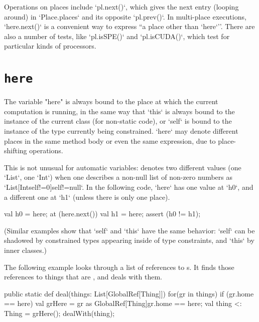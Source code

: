 Operations on places include \xcd`pl.next()`, which gives the next entry
(looping around) in \xcd`Place.places` and its opposite \xcd`pl.prev()`. 
In multi-place executions, 
\xcd`here.next()` is a convenient way to express ``a place other than \xcd`here`''.
There are also a number of tests, like \xcd`pl.isSPE()` and 
\xcd`pl.isCUDA()`, which test for particular kinds of processors.




\section{{\tt here}}\label{Here}

The variable \xcd"here" is always bound to the place at which the current
computation is running, in the same way that \xcd`this` is always bound to the
instance of the current class (for non-static code), or \xcd`self` is bound to
the instance of the type currently being constrained.  
\xcd`here` may denote different places in the same method body or even the
same expression, due to
place-shifting operations.


This is not unusual for automatic variables:   denotes 
two different values (one \xcd`List`, one \xcd`Int`) 
when one describes a non-null list of non-zero numbers as
\xcd`List[Int{self!=0}]{self!=null}`. In the following 
code, \xcd`here` has one value at 
\xcd`h0`, and a different one at \xcd`h1` (unless there is only one place).
\begin{xten}
val h0 = here;
at (here.next()) {
  val h1 = here; 
  assert (h0 != h1);
}
\end{xten}
% 
\noindent
(Similar examples show that \xcd`self` and \xcd`this` have the same behavior:
\xcd`self` can be shadowed by constrained types appearing inside of type
constraints, and \xcd`this` by inner classes.)



The following example looks through a list of references to s.  
It finds those references to things that are , and deals with them.  
\begin{xten}
  public static def deal(things: List[GlobalRef[Thing]]) {
     for(gr in things) {
        if (gr.home == here) {
           val grHere = 
               gr as GlobalRef[Thing]{gr.home == here};
           val thing <: Thing = grHere();
           dealWith(thing);
        }
     }
  }
\end{xten}
% 

